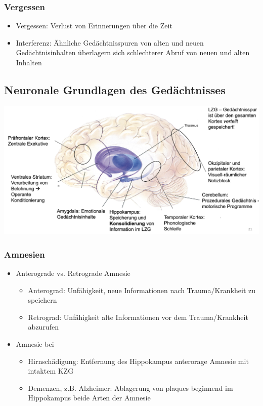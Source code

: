 \subsubsection{Vergessen}
\begin{itemize}
	\item Vergessen: Verlust von Erinnerungen über die Zeit
	\item Interferenz: Ähnliche Gedächtnisspuren von alten und neuen Gedächtnisinhalten überlagern sich \rightarrow schlechterer Abruf von neuen und alten Inhalten 
\end{itemize}
\subsection{Neuronale Grundlagen des Gedächtnisses}
\begin{center}
	\includegraphics[scale=.2]{img/Gedeachtnis_Gehrin.png}
\end{center}
\subsubsection{Amnesien}
\begin{itemize}
	\item Anterograde vs. Retrograde Amnesie
		\begin{itemize}
			\item Anterograd: Unfähigkeit, neue Informationen nach Trauma/Krankheit zu speichern
			\item Retrograd: Unfähigkeit alte Informationen vor dem Trauma/Krankheit abzurufen
		\end{itemize}
	\item Amnesie bei
		\begin{itemize}
			\item Hirnschädigung: Entfernung des Hippokampus \rightarrow anterorage Amnesie mit intaktem KZG
			\item Demenzen, z.B. Alzheimer: Ablagerung von plaques beginnend im Hippokampus \rightarrow beide Arten der Amnesie
		\end{itemize}
\end{itemize}


